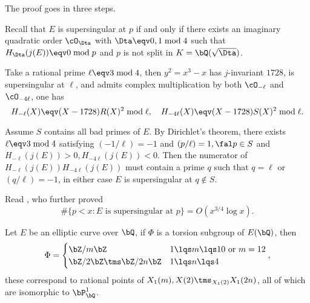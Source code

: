 \documentclass[article, a4paper, twoside]{universal}
\begin{document}
\begin{prf}
	The proof goes in three steps.

	 Recall that $E$ is supersingular at $p$ if and only if there exists an imaginary quadratic order $\cO_{\Dta}$ with $\Dta\eqv0,1\bmod{4}$ such that $H_{\Dta}(j(E))\eqv0\bmod{p}$ and $p$ is not split in $K=\bQ(\sqrt{\Dta})$.

	 Take a rational prime $\ell\eqv3\bmod{4}$, then $y^{2}=x^{3}-x$ has $j$-invariant $1728$, is supersingular at $\ell$, and admits complex multiplication by both $\cO_{-\ell}$ and $\cO_{-4\ell}$, one has
	\[
		H_{-\ell}(X)\eqv(X-1728)R(X)^{2}\bmod{\ell},\quad H_{-4\ell}(X)\eqv(X-1728)S(X)^{2}\bmod{\ell}.
	\]

	 Assume $S$ contains all bad primes of $E$. By Dirichlet's theorem, there exists $\ell\eqv3\bmod{4}$ satisfying $(-1/\ell)=-1$ and $(p/\ell)=1,\fal p\in S$ and $H_{-\ell}(j(E))>0, H_{-4\ell}(j(E))<0$. Then the numerator of $H_{-\ell}(j(E))H_{-4\ell}(j(E))$ must contain a prime $q$ such that $q=\ell$ or $(q/\ell)=-1$, in either case $E$ is supersingular at $q\nin S$.
\end{prf}

\begin{rmk}
	Read \cite{Elkies1991Supersingular}, who further proved
	\[
		\#\{p<x:E\text{ is supersingular at } p\}=O(x^{3/4}\log{x}).
	\]
\end{rmk}


\begin{thm}
	Let $E$ be an elliptic curve over $\bQ$, if $\Phi$ is a torsion subgroup of $E(\bQ)$, then
	\[
		\Phi=\begin{cases}
			\bZ/m\bZ & \text{$1\lqs m\lqs10$ or $m=12$} \\
			\bZ/2\bZ\tms\bZ/2n\bZ & \text{$1\lqs n\lqs 4$}
		  \end{cases},
	\]
	these correspond to rational points of $X_{1}(m),X(2)\tms_{X_{1}(2)}X_{1}(2n)$, all of which are isomorphic to $\bP_{\bQ}^{1}$.
\end{thm}
\end{document}
